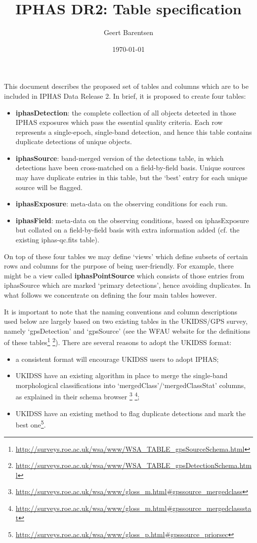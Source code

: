 \documentclass[12pt]{article}
\title{IPHAS DR2: Table specification}
\date{\today}
\author{Geert Barentsen}
\begin{document}
\maketitle

This document describes the proposed set of tables and columns which are to be 
included in IPHAS Data Release 2. In brief, it is proposed to create four 
tables:
\begin{itemize}
\item \textbf{iphasDetection}: the complete collection of all objects detected 
in those IPHAS exposures which pass the essential quality criteria. Each row 
represents a single-epoch, single-band detection, and hence this table 
contains duplicate detections of unique objects.
\item \textbf{iphasSource}: band-merged version of the detections table, in 
which detections have been cross-matched on a field-by-field basis. Unique 
sources may have duplicate entries in this table, but the `best' entry for 
each unique source will be flagged. 
\item \textbf{iphasExposure}: meta-data on the observing conditions for each 
run.
\item \textbf{iphasField}: meta-data on the observing conditions, based on 
iphasExposure but collated on a field-by-field basis with extra information added (cf. the existing iphas-qc.fits table).
\end{itemize}

On top of these four tables we may define `views' which define subsets of 
certain rows and columns for the purpose of being user-friendly. For example, 
there might be a view called \textbf{iphasPointSource} which consists of those 
entries from iphasSource which are marked `primary detections', hence avoiding duplicates. In what follows we concentrate on defining the four main tables however.

It is important to note that the naming conventions and column descriptions 
used below are largely based on two existing tables in the UKIDSS/GPS survey, 
namely `gpsDetection' and `gpsSource' (see the WFAU website for the 
definitions of these tables\footnote{\url{http://surveys.roe.ac.uk/wsa/www/WSA_TABLE_gpsSourceSchema.html}}
\footnote{\url{http://surveys.roe.ac.uk/wsa/www/WSA_TABLE_gpsDetectionSchema.html}}). 
There are several reasons to adopt the UKIDSS format:
\begin{itemize}
\item a consistent format will encourage UKIDSS users to adopt IPHAS;
\item UKIDSS have an existing algorithm in place to merge the single-band 
morphological classifications into `mergedClass'/`mergedClassStat' columns, as 
explained in their schema browser
\footnote{\url{http://surveys.roe.ac.uk/wsa/www/gloss_m.html#gpssource_mergedclass}}
\footnote{\url{http://surveys.roe.ac.uk/wsa/www/gloss_m.html#gpssource_mergedclassstat}};
\item UKIDSS have an existing method to flag duplicate detections and mark the 
best one\footnote{\url{http://surveys.roe.ac.uk/wsa/www/gloss_p.html#gpssource_priorsec}}.
\end{itemize}
\end{document}
